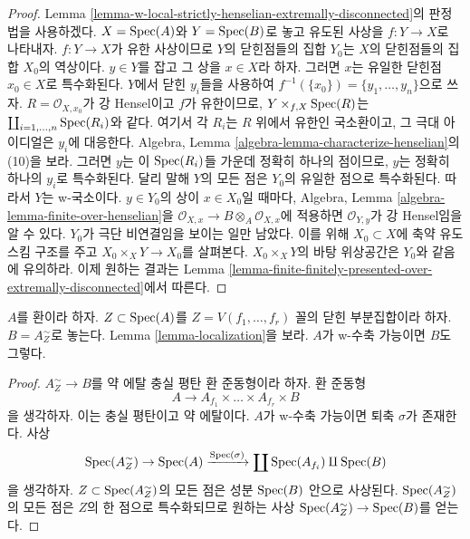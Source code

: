 \begin{proof}
Lemma \ref{lemma-w-local-strictly-henselian-extremally-disconnected}의
판정법을 사용하겠다. $X = \mathop{\mathrm{Spec}}(A)$와 $Y = \mathop{\mathrm{Spec}}(B)$로 놓고
유도된 사상을 $f : Y \to X$로 나타내자.
$f : Y \to X$가 유한 사상이므로 $Y$의 닫힌점들의 집합 $Y_0$는
$X$의 닫힌점들의 집합 $X_0$의 역상이다.
$y \in Y$를 잡고 그 상을 $x \in X$라 하자. 그러면 $x$는
유일한 닫힌점 $x_0 \in X$로 특수화된다.
$Y$에서 닫힌 $y_i$들을 사용하여
$f^{-1}(\{x_0\}) = \{y_1, \ldots, y_n\}$으로 쓰자.
$R = \mathcal{O}_{X, x_0}$가 강 Hensel이고 $f$가 유한이므로,
$Y \times_{f, X} \mathop{\mathrm{Spec}}(R)$는
$\coprod_{i = 1, \ldots, n} \mathop{\mathrm{Spec}}(R_i)$와 같다. 여기서 각 $R_i$는
$R$ 위에서 유한인 국소환이고, 그 극대 아이디얼은 $y_i$에 대응한다.
Algebra, Lemma \ref{algebra-lemma-characterize-henselian}의 (10)을 보라.
그러면 $y$는 이 $\mathop{\mathrm{Spec}}(R_i)$들 가운데 정확히 하나의 점이므로,
$y$는 정확히 하나의 $y_i$로 특수화된다. 달리 말해 $Y$의 모든 점은
$Y_0$의 유일한 점으로 특수화된다. 따라서 $Y$는 w-국소이다.
$y \in Y_0$의 상이 $x \in X_0$일 때마다, Algebra, Lemma
\ref{algebra-lemma-finite-over-henselian}을
$\mathcal{O}_{X, x} \to B \otimes_A \mathcal{O}_{X, x}$에 적용하면
$\mathcal{O}_{Y, y}$가 강 Hensel임을 알 수 있다.
$Y_0$가 극단 비연결임을 보이는 일만 남았다. 이를 위해
$X_0 \subset X$에 축약 유도 스킴 구조를 주고
$X_0 \times_X Y \to X_0$를 살펴본다.
$X_0 \times_X Y$의 바탕 위상공간은 $Y_0$와 같음에 유의하라.
이제 원하는 결과는 Lemma
\ref{lemma-finite-finitely-presented-over-extremally-disconnected}에서 따른다.
\end{proof}

\begin{lemma}
\label{lemma-localization-w-contractible}
$A$를 환이라 하자. $Z \subset \mathop{\mathrm{Spec}}(A)$를
$Z = V(f_1, \ldots, f_r)$ 꼴의 닫힌 부분집합이라 하자.
$B = A_Z^\sim$로 놓는다. Lemma \ref{lemma-localization}을 보라.
$A$가 w-수축 가능이면 $B$도 그렇다.
\end{lemma}

\begin{proof}
$A_Z^\sim \to B$를 약 에탈 충실 평탄 환 준동형이라 하자.
환 준동형
$$
A \longrightarrow A_{f_1} \times \ldots \times A_{f_r} \times B
$$
을 생각하자. 이는 충실 평탄이고 약 에탈이다.
$A$가 w-수축 가능이면 퇴축 $\sigma$가 존재한다. 사상
$$
\mathop{\mathrm{Spec}}(A_Z^\sim) \to \mathop{\mathrm{Spec}}(A) \xrightarrow{\mathop{\mathrm{Spec}}(\sigma)}
\coprod \mathop{\mathrm{Spec}}(A_{f_i}) \amalg \mathop{\mathrm{Spec}}(B)
$$
을 생각하자. $Z \subset \mathop{\mathrm{Spec}}(A_Z^\sim)$의 모든 점은 성분
$\mathop{\mathrm{Spec}}(B)$ 안으로 사상된다. $\mathop{\mathrm{Spec}}(A_Z^\sim)$의 모든 점은 $Z$의
한 점으로 특수화되므로 원하는 사상
$\mathop{\mathrm{Spec}}(A_Z^\sim) \to \mathop{\mathrm{Spec}}(B)$를 얻는다.
\end{proof}






